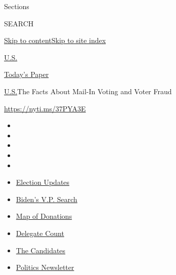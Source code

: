 Sections

SEARCH

\protect\hyperlink{site-content}{Skip to
content}\protect\hyperlink{site-index}{Skip to site index}

\href{https://www.nytimes3xbfgragh.onion/section/us}{U.S.}

\href{https://myaccount.nytimes3xbfgragh.onion/auth/login?response_type=cookie\&client_id=vi}{}

\href{https://www.nytimes3xbfgragh.onion/section/todayspaper}{Today's
Paper}

\href{/section/us}{U.S.}\textbar{}The Facts About Mail-In Voting and
Voter Fraud

\href{https://nyti.ms/37PYA3E}{https://nyti.ms/37PYA3E}

\begin{itemize}
\item
\item
\item
\item
\item
\end{itemize}

\begin{itemize}
\item
  \href{https://www.nytimes3xbfgragh.onion/2020/08/03/us/elections/biden-vs-trump.html?action=click\&pgtype=Article\&state=default\&region=TOP_BANNER\&context=storylines_menu}{Election
  Updates}
\item
  \href{https://www.nytimes3xbfgragh.onion/article/biden-vice-president-2020.html?action=click\&pgtype=Article\&state=default\&region=TOP_BANNER\&context=storylines_menu}{Biden's
  V.P. Search}
\item
  \href{https://www.nytimes3xbfgragh.onion/interactive/2020/07/24/us/politics/trump-biden-campaign-donors.html?action=click\&pgtype=Article\&state=default\&region=TOP_BANNER\&context=storylines_menu}{Map
  of Donations}
\item
  \href{https://www.nytimes3xbfgragh.onion/interactive/2020/us/elections/delegate-count-primary-results.html?action=click\&pgtype=Article\&state=default\&region=TOP_BANNER\&context=storylines_menu}{Delegate
  Count}
\item
  \href{https://www.nytimes3xbfgragh.onion/interactive/2019/us/politics/2020-presidential-candidates.html?action=click\&pgtype=Article\&state=default\&region=TOP_BANNER\&context=storylines_menu}{The
  Candidates}
\item
  \href{https://www.nytimes3xbfgragh.onion/newsletters/politics?action=click\&pgtype=Article\&state=default\&region=TOP_BANNER\&context=storylines_menu}{Politics
  Newsletter}
\end{itemize}

